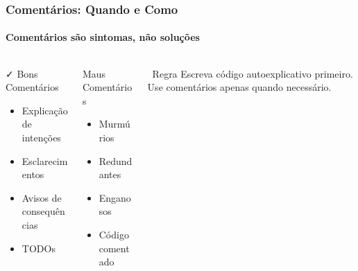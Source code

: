 \documentclass[aspectratio=169]{beamer}
\begin{document}
\begin{frame}
\frametitle{Comentários: Quando e Como}
\framesubtitle{Comentários são sintomas, não soluções}

\begin{center}
\end{center}

\vspace{0.3cm}
\begin{columns}
\begin{column}{0.3\textwidth}
\begin{block}{\textcolor{cleangreen}{\faCheck} Bons Comentários}
\scriptsize
\begin{itemize}
    \item Explicação de intenções
    \item Esclarecimentos
    \item Avisos de consequências
    \item TODOs
\end{itemize}
\end{block}
\end{column}

\begin{column}{0.3\textwidth}
\begin{block}{\textcolor{cleanred}{\faTimes} Maus Comentários}
\scriptsize
\begin{itemize}
    \item Murmúrios
    \item Redundantes
    \item Enganosos
    \item Código comentado
\end{itemize}
\end{block}
\end{column}

\begin{column}{0.3\textwidth}
\begin{block}{\faInfoCircle\ Regra}
\scriptsize
Escreva código autoexplicativo primeiro. Use comentários apenas quando necessário.
\end{block}
\end{column}
\end{columns}
\end{frame}
\end{document}
